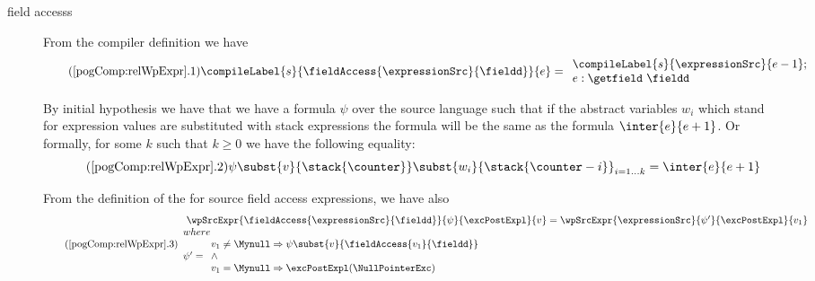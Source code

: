 \begin{description}
       \item[field accesss]
            
	            From the compiler definition we have
                     \begin{equation*}\label{pog1} \tag{\ref{pogComp:relWpExpr}.1}
		       \compileLabel{s}{\fieldAccess{\expressionSrc}{\fieldd}}{e} = \\
		     \begin{array}{l}
			   \compileLabel{s}{\expressionSrc}{e - 1}; \\ 
			    e  : \getfield  \ \fieldd
			    \end{array}
		     \end{equation*}
		 	
	       By initial hypothesis we have that we have a formula $\psi$ over the source language such that if the abstract variables $w_i$ 
	       which stand for expression values are substituted with stack expressions the formula will be the same as the formula
	      $\inter{e}{e+1} $. Or formally,  for some $k$ such that $k \ge 0$ we have the following equality:      \\
	      \begin{equation*}\label{pog2} \tag{\ref{pogComp:relWpExpr}.2}  
	            \psi \subst{v}{\stack{\counter}}\subst{w_i}{\stack{\counter - i}}_{i = 1 \ldots k}  = \inter{e}{e+1} 
	      \end{equation*}	    

		  From the definition of the \wpName{} for source field access expressions, we have also   
		   \begin{equation*}\label{pog3} \tag{\ref{pogComp:relWpExpr}.3}  
		   \begin{array}{l} \ \wpSrcExpr{\fieldAccess{\expressionSrc}{\fieldd} }{\psi}{\excPostExpl}{v} = 
		  \wpSrcExpr{\expressionSrc}{\psi'}{\excPostExpl }{v_1}  \\
		  where \\ 
		   \psi'  =                   \begin{array}{l} 
		                                 v_1 \neq \Mynull \Rightarrow \psi \subst{v}{\fieldAccess{v_1}{\fieldd}} \\
						 \wedge \\
						 v_1 = \Mynull \Rightarrow  \excPostExpl(\NullPointerExc)
					       \end{array}
				\end{array}  \\
		  \end{equation*}
		 

\end{description}

